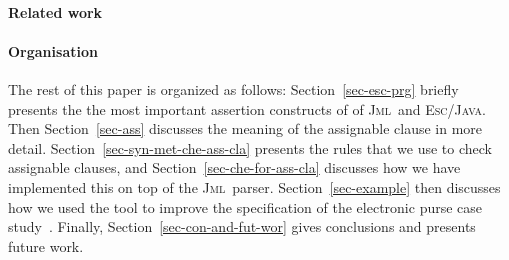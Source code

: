 \documentclass[a4paper]{llncs}
\newcommand{\jml}{\textsc{Jml}}
\newcommand{\escj}{\textsc{Esc/Java}}
\newcommand{\jass}{\textsc{Jass}}
\newcommand{\java}{\textsc{Java}}
\newcommand{\modtool}{\texttt{assignable:tool}}
\begin{document}





\paragraph{\bf{Related work}}


\paragraph{\bf{Organisation}}

The rest of this paper is organized as follows:
Section~\ref{sec-esc-prg} briefly presents the the most important
assertion constructs of of \jml\ and \escj. Then Section~\ref{sec-ass} 
discusses the meaning of the assignable clause in more detail.
Section~\ref{sec-syn-met-che-ass-cla}
presents the rules that we use to check assignable clauses, and
Section~\ref{sec-che-for-ass-cla} discusses how we have implemented
this on top of the \jml\ parser. Section~\ref{sec-example} then
discusses how we used the tool to improve the specification of the
electronic purse case study~\cite{CatanoH02a}. Finally,
Section~\ref{sec-con-and-fut-wor} gives conclusions and presents
future work.
\end{document}
